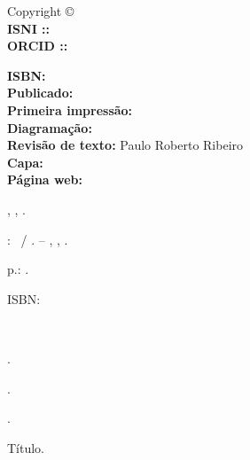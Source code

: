 
\newpage
\thispagestyle{empty}

{\fontsize{0.035\textwidth}{0} \normalfont
\noindent Copyright \copyright\ \imprimiryear\ \myauthor\\ %
\noindent \textbf{ISNI  ::} \imprimirISNI\\
\noindent \textbf{ORCID ::} \imprimirOrcid\\

\vspace{20pt}

\noindent \textbf{ISBN:} \imprimirisbn\\ %
\noindent \textbf{Publicado:} \imprimireditora\\ %
\noindent \textbf{Primeira impressão:} \imprimiryear\\ %
\noindent \textbf{Diagramação:} \myauthor\\ %
\noindent \textbf{Revisão de texto:} Paulo Roberto Ribeiro\\ %
\noindent \textbf{Capa:} \myauthor\\ %
\noindent \textbf{Página web:} \ImprimirLinkHomePageLivro\\ %
\vfill
\begin{center}
\begin{catalografica}%
	\myauthorlastname, \myauthorname, \myauthorborn.%

	\hspace{0.5cm} \mytitle: \mysubtitle~/ \myauthor. -- %
	\imprimirlocal, \imprimireditora, \imprimiryear.
	
	\hspace{0.5cm} \pageref{LastPage} p.: \imprimirpapersize.\\ %
	
	\hspace{0.5cm}
	\parbox[t]{\textwidth}{\imprimirtipotrabalho}%

	\hspace{0.5cm}
	\parbox[t]{\textwidth}{ISBN: \imprimirisbn}\\


	\hspace{0.5cm}
	\begin{inparaenum}[1.]
		\item \palavraschavea.
		\item \palavraschaveb.
		\item \palavraschavec.
	\end{inparaenum}
	\begin{inparaenum}[I.]
		\item Título.%
	\end{inparaenum}


\end{catalografica}
\end{center}}
